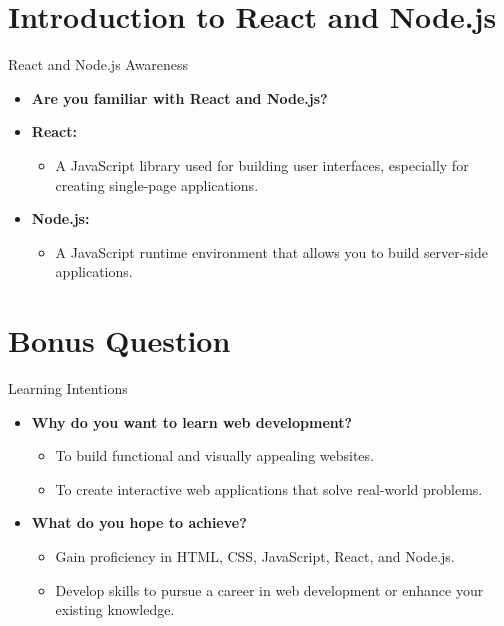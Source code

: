 \documentclass{beamer}
\begin{document}
\section{Introduction to React and Node.js}
\begin{frame}{React and Node.js Awareness}
    \begin{itemize}
        \item \textbf{Are you familiar with React and Node.js?}
        \item \textbf{React:}
        \begin{itemize}
            \item A JavaScript library used for building user interfaces, especially for creating single-page applications.
        \end{itemize}
        \item \textbf{Node.js:}
        \begin{itemize}
            \item A JavaScript runtime environment that allows you to build server-side applications.
        \end{itemize}
    \end{itemize}
\end{frame}

\section{Bonus Question}
\begin{frame}{Learning Intentions}
    \begin{itemize}
        \item \textbf{Why do you want to learn web development?}
        \begin{itemize}
            \item To build functional and visually appealing websites.
            \item To create interactive web applications that solve real-world problems.
        \end{itemize}
        \item \textbf{What do you hope to achieve?}
        \begin{itemize}
            \item Gain proficiency in HTML, CSS, JavaScript, React, and Node.js.
            \item Develop skills to pursue a career in web development or enhance your existing knowledge.
        \end{itemize}
    \end{itemize}
\end{frame}
\end{document}
